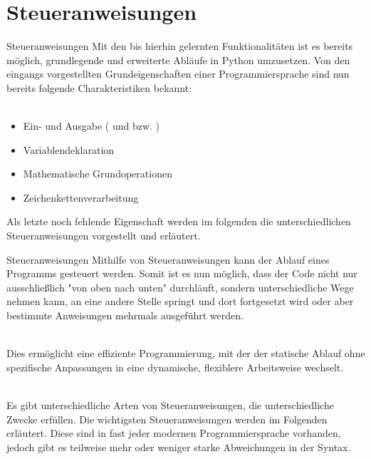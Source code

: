 \section{Steueranweisungen}
    
    \begin{frame}{Steueranweisungen}
        Mit den bis hierhin gelernten Funktionalitäten ist es bereits möglich, grundlegende und erweiterte Abläufe in Python umzusetzen. Von den eingangs vorgestellten Grundeigenschaften einer Programmiersprache sind nun bereits folgende Charakteristiken bekannt: \\~\
        
        \begin{itemize}
            \item Ein- und Ausgabe ( und  bzw. )
            \item Variablendeklaration
            \item Mathematische Grundoperationen
            \item Zeichenkettenverarbeitung
        \end{itemize}
        
        Als letzte noch fehlende Eigenschaft werden im folgenden die unterschiedlichen Steueranweisungen vorgestellt und erläutert.
    \end{frame}
    
    \begin{frame}{Steueranweisungen}
        Mithilfe von Steueranweisungen kann der Ablauf eines Programms gesteuert werden. Somit ist es nun möglich, dass der Code nicht nur ausschließlich "von oben nach unten" durchläuft, sondern unterschiedliche Wege nehmen kann, an eine andere Stelle springt und dort fortgesetzt wird oder aber bestimmte Anweisungen mehrmals ausgeführt werden. \\~\
        
        Dies ermöglicht eine effiziente Programmierung, mit der der statische Ablauf ohne spezifische Anpassungen in eine dynamische, flexiblere Arbeitsweise wechselt. \\~\
        
        Es gibt unterschiedliche Arten von Steueranweisungen, die unterschiedliche Zwecke erfüllen. Die wichtigsten Steueranweisungen werden im Folgenden erläutert. Diese sind in fast jeder modernen Programmiersprache vorhanden, jedoch gibt es teilweise mehr oder weniger starke Abweichungen in der Syntax.
    \end{frame}
    
